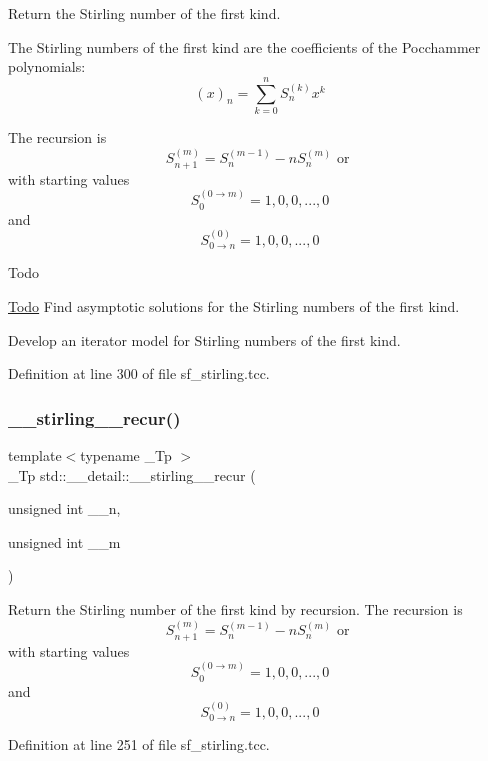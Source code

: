 Return the Stirling number of the first kind.

The Stirling numbers of the first kind are the coefficients of the Pocchammer polynomials\+: \[ (x)_n = \sum_{k=0}^{n} S_n^{(k)} x^k \]

The recursion is \[ S_{n+1}^{(m)} = S_n^{(m-1)} - n S_n^{(m)} \mbox{ or } \] with starting values \[ S_0^{(0\rightarrow m)} = {1, 0, 0, ..., 0} \] and \[ S_{0\rightarrow n}^{(0)} = {1, 0, 0, ..., 0} \]

\begin{DoxyRefDesc}{Todo}
\item[\hyperlink{todo__todo000017}{Todo}]Find asymptotic solutions for the Stirling numbers of the first kind. 

Develop an iterator model for Stirling numbers of the first kind. \end{DoxyRefDesc}


Definition at line 300 of file sf\+\_\+stirling.\+tcc.

\mbox{\label{namespacestd_1_1____detail_a0a47b5d34956a55f438f2ba079680acd}} 
\subsubsection{\texorpdfstring{\+\_\+\+\_\+stirling\+\_\+\_\+recur()}{\_\_stirling\_1\_recur()}}
{\footnotesize\ttfamily template$<$typename \+\_\+\+Tp $>$ \\
\+\_\+\+Tp std\+::\+\_\+\+\_\+detail\+::\+\_\+\+\_\+stirling\+\_\+\_\+recur (\begin{DoxyParamCaption}\item[{unsigned int}]{\+\_\+\+\_\+n,  }\item[{unsigned int}]{\+\_\+\+\_\+m }\end{DoxyParamCaption})}

Return the Stirling number of the first kind by recursion. The recursion is \[ S_{n+1}^{(m)} = S_n^{(m-1)} - n S_n^{(m)} \mbox{ or } \] with starting values \[ S_0^{(0\rightarrow m)} = {1, 0, 0, ..., 0} \] and \[ S_{0\rightarrow n}^{(0)} = {1, 0, 0, ..., 0} \] 

Definition at line 251 of file sf\+\_\+stirling.\+tcc.

